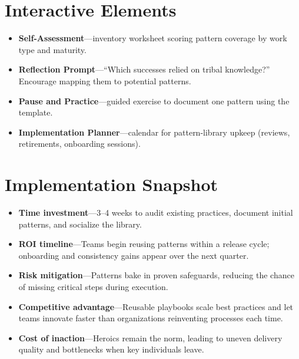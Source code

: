 \section{Interactive Elements}
\label{sec:implementation-interactive}
\begin{itemize}
    \item \textbf{Self-Assessment}—inventory worksheet scoring pattern coverage by work type and maturity.
    \item \textbf{Reflection Prompt}—``Which successes relied on tribal knowledge?'' Encourage mapping them to potential patterns.
    \item \textbf{Pause and Practice}—guided exercise to document one pattern using the template.
    \item \textbf{Implementation Planner}—calendar for pattern-library upkeep (reviews, retirements, onboarding sessions).
\end{itemize}
\section{Implementation Snapshot}
\label{sec:implementation-snapshot}
\begin{itemize}
    \item \textbf{Time investment}—3--4 weeks to audit existing practices, document initial patterns, and socialize the library.
    \item \textbf{ROI timeline}—Teams begin reusing patterns within a release cycle; onboarding and consistency gains appear over the next quarter.
    \item \textbf{Risk mitigation}—Patterns bake in proven safeguards, reducing the chance of missing critical steps during execution.
    \item \textbf{Competitive advantage}—Reusable playbooks scale best practices and let teams innovate faster than organizations reinventing processes each time.
    \item \textbf{Cost of inaction}—Heroics remain the norm, leading to uneven delivery quality and bottlenecks when key individuals leave.
\end{itemize}
